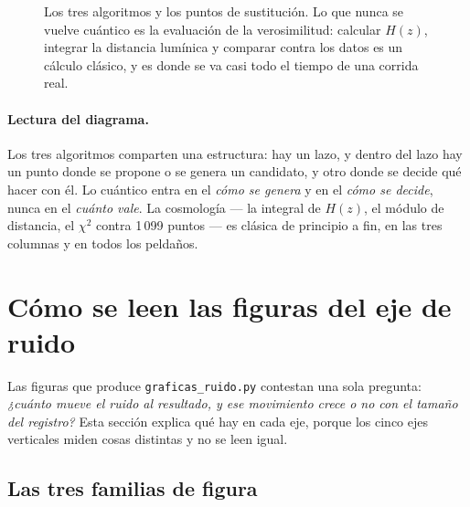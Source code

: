\documentclass[11pt,a4paper]{article}
\begin{document}
\begin{figure}[H]
\caption{Los tres algoritmos y los puntos de sustitución. Lo que nunca se
vuelve cuántico es la evaluación de la verosimilitud: calcular $H(z)$,
integrar la distancia lumínica y comparar contra los datos es un cálculo
clásico, y es donde se va casi todo el tiempo de una corrida real.}
\end{figure}

\paragraph{Lectura del diagrama.} Los tres algoritmos comparten una
estructura: hay un lazo, y dentro del lazo hay un punto donde se propone o
se genera un candidato, y otro donde se decide qué hacer con él. Lo cuántico
entra en el \emph{cómo se genera} y en el \emph{cómo se decide}, nunca en el
\emph{cuánto vale}. La cosmología --- la integral de $H(z)$, el módulo de
distancia, el $\chi^2$ contra 1\,099 puntos --- es clásica de principio a
fin, en las tres columnas y en todos los peldaños.

\clearpage
\section{Cómo se leen las figuras del eje de ruido}

Las figuras que produce \texttt{graficas\_ruido.py} contestan una sola
pregunta: \emph{¿cuánto mueve el ruido al resultado, y ese movimiento crece o
no con el tamaño del registro?} Esta sección explica qué hay en cada eje,
porque los cinco ejes verticales miden cosas distintas y no se leen igual.

\subsection{Las tres familias de figura}
\end{document}
